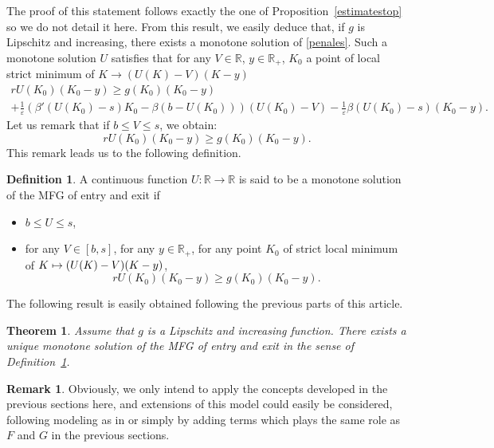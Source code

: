 \documentclass[10pt]{amsart}
\newcommand\mto{\mathchoice{\longmapsto}{\mapsto}{\mapsto}{\mapsto}}
\let\epsilon\varepsilon
\newtheorem{Theorem}{Theorem}[section]
\theoremstyle{definition}
\newtheorem{Def}{Definition}[section]
\newtheorem{Rem}{Remark}[section]
\begin{document}
The proof of this statement follows exactly the one of Proposition~\ref{estimatestop} so we do not detail it here. From this result, we easily deduce that, if $g$ is Lipschitz and increasing, there exists a monotone solution of \eqref{penales}. Such a monotone solution $U$ satisfies that for any $V \in \mathbb{R}$, $y \in \mathbb{R}_+$, $K_0$ a point of local strict minimum of $K \to (U(K)-V)(K-y)$
\begin{multline*}
rU(K_0)(K_0-y) \geq g(K_0)(K_0-y)\\
+\frac{1}{\epsilon} \left(\beta'(U(K_0)-s)K_0-\beta(b-U(K_0))\right)(U(K_0)-V)
- \frac{1}{\epsilon}\beta(U(K_0) -s)(K_0-y).
\end{multline*}
Let us remark that if $b \leq V \leq s$, we obtain:
\begin{equation*}
rU(K_0)(K_0-y) \geq g(K_0)(K_0-y).
\end{equation*}
This remark leads us to the following definition.
\begin{Def}\label{defes}
A continuous function $U: \mathbb{R} \to \mathbb{R}$ is said to be a monotone solution of the MFG of entry and exit if
\begin{itemize}
\item $b \leq U \leq s$,
\item for any $V \in [b,s]$, for any $y \in \mathbb{R}_+$, for any point $K_0$ of strict local minimum of $K \mto (U(K)-V)(K-y)$,
\begin{equation*}
rU(K_0)(K_0-y) \geq g(K_0)(K_0-y).
\end{equation*}
\end{itemize}
\end{Def}
The following result is easily obtained following the previous parts of this article.
\begin{Theorem}
Assume that $g$ is a Lipschitz and increasing function. There exists a unique monotone solution of the MFG of entry and exit in the sense of Definition~\ref{defes}.
\end{Theorem}
\begin{Rem}
Obviously, we only intend to apply the concepts developed in the previous sections here, and extensions of this model could easily be considered, following modeling as in \cite{bertucci2020mean} or simply by adding terms which plays the same role as $F$ and $G$ in the previous sections.
\end{Rem}
\end{document}
